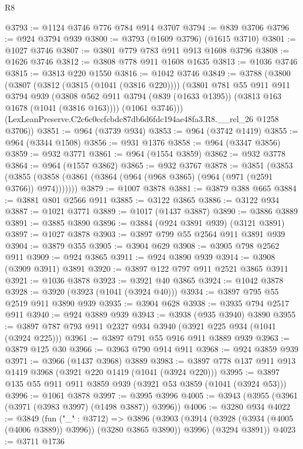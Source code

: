 \begin{lexlean}{R8}
\begin{coremodule}
@3793 := @1124 @3746 @776 @784 @914 @3707
@3794 := @839 @3706
@3796 := @924 @3794 @939
@3800 := @3793 (@1609 @3796) (@1615 @3710)
@3801 := @1027 @3746
@3807 := @3801 @779 @783 @911 @913 @1608 @3796
@3808 := @1626 @3746
@3812 := @3808 @778 @911 @1608 @1635
@3813 := @1036 @3746
@3815 := @3813 @220 @1550
@3816 := @1042 @3746
@3849 := @3788
    (@3800
      (@3807
        (@3812 (@3815 (@1041 (@3816 @220))))
        (@3801
          @781
          @55
          @911
          @911
          @3794
          @939
          (@3808 @562 @911 @3794 (@839 (@1633 @1395)) (@3813 @163 @1678 (@1041 (@3816 @163))))
          (@1061 @3746)))
      (LexLeanPreserve.C2c6c0ccfcbdc87db6d6fdc194ae48fa3.R8.__rel_26 @1258 @3706))
@3851 := @964 (@3739 @934)
@3853 := @964 (@3742 @1419)
@3855 := @964 (@3344 @1508)
@3856 := @931 @1376
@3858 := @964 (@3347 @3856)
@3859 := @932 @3771
@3861 := @964 (@1554 @3859)
@3862 := @932 @3778
@3864 := @964 (@1557 @3862)
@3865 := @932 @3767
@3878 := @3851
    (@3853 (@3855 (@3858 (@3861 (@3864 (@964 (@968 @3865) (@964 (@971 (@2591 @3766)) @974)))))))
@3879 := @1007 @3878
@3881 := @3879 @388 @665
@3884 := @3881 @801 @2566 @911
@3885 := @3122 @3865
@3886 := @3122 @934
@3887 := @1021 @3771
@3889 := @1017 (@1437 @3887)
@3890 := @3886 @3889
@3891 := @3885 @3890
@3896 := @3884 (@924 @3891 @939) (@3121 @3891)
@3897 := @1027 @3878
@3903 := @3897 @799 @55 @2564 @911 @3891 @939
@3904 := @3879 @355
@3905 := @3904 @629
@3908 := @3905 @798 @2562 @911
@3909 := @924 @3865
@3911 := @924 @3890 @939
@3914 := @3908 (@3909 @3911) @3891
@3920 := @3897 @122 @797 @911 @2521 @3865 @3911
@3921 := @1036 @3878
@3923 := @3921 @40 @3865
@3924 := @1042 @3878
@3928 := @3920 (@3923 (@1041 (@3924 @40)))
@3934 := @3897 @795 @55 @2519 @911 @3890 @939
@3935 := @3904 @628
@3938 := @3935 @794 @2517 @911
@3940 := @924 @3889 @939
@3943 := @3938 (@935 @3940) @3890
@3955 := @3897 @787 @793 @911 @2327 @934 @3940 (@3921 @225 @934 (@1041 (@3924 @225)))
@3961 := @3897 @791 @55 @916 @911 @3889 @939
@3963 := @3879 @125 @30
@3966 := @3963 @790 @914 @911
@3968 := @924 @3859 @939
@3971 := @3966 (@1437 @3968) @3889
@3983 := @3897 @778 @137 @911 @913 @1419 @3968 (@3921 @220 @1419 (@1041 (@3924 @220)))
@3995 := @3897 @135 @55 @911 @911 @3859 @939 (@3921 @53 @3859 (@1041 (@3924 @53)))
@3996 := @1061 @3878
@3997 := @3995 @3996
@4005 := @3943 (@3955 (@3961 (@3971 (@3983 @3997) (@1498 @3887)) @3996))
@4006 := @3280 @934
@4022 := @3849
    (fun ("_" : @3712) =>
    @3896
      (@3903 (@3914 (@3928 (@3934 (@4005 (@4006 @3889)) @3996)) (@3280 @3865 @3890)) @3996)
      (@3294 @3891))
@4023 := @3711 @1736

\end{coremodule}
\end{lexlean}
